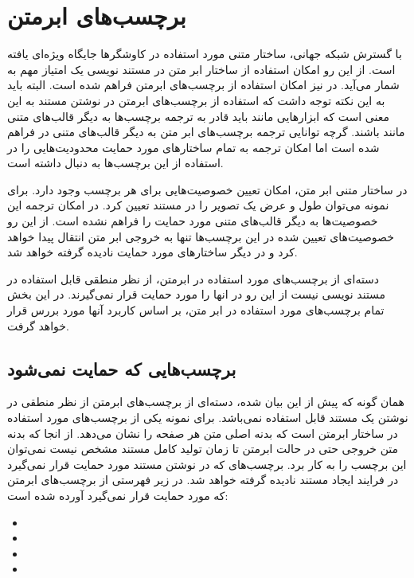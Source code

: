 
\section{برچسب‌های ابرمتن}
با گسترش شبکه جهانی، ساختار متنی مورد استفاده در کاوشگرها جایگاه ویژه‌ای یافته است. از این رو امکان
استفاده از ساختار ابر متن در مستند نویسی یک امتیاز مهم به شمار می‌آید. در  نیز امکان استفاده از برچسب‌های 
ابرمتن فراهم شده است. البته باید به این نکته توجه داشت که استفاده از برچسب‌های ابرمتن در نوشتن مستند به این معنی است که 
ابزارهایی مانند  باید قادر به ترجمه برچسب‌ها به دیگر قالب‌های متنی مانند  باشند. گرچه توانایی ترجمه
برچسب‌های ابر متن به دیگر قالب‌های متنی در  فراهم شده است اما  امکان ترجمه به تمام ساختارهای مورد حمایت محدودیت‌هایی
را در استفاده از این برچسب‌ها به دنبال داشته است.

در ساختار متنی ابر متن، امکان تعیین خصوصیت‌هایی برای هر برچسب وجود دارد. برای نمونه می‌توان  طول و عرض یک تصویر را در مستند 
تعیین کرد. در  امکان ترجمه این خصوصیت‌ها به دیگر قالب‌های متنی مورد حمایت را فراهم نشده است. از این رو خصوصیت‌های 
تعیین شده در این برچسب‌ها تنها به خروجی ابر متن انتقال پیدا خواهد کرد و در دیگر ساختارهای مورد حمایت نادیده گرفته خواهد شد.

دسته‌ای از برچسب‌های مورد استفاده در ابرمتن، از نظر منطقی قابل استفاده در مستند نویسی نیست از این رو در  انها را مورد 
حمایت قرار نمی‌گیرند. در این بخش تمام برچسب‌های مورد استفاده در ابر متن، بر اساس کاربرد‌ آنها مورد بررس قرار خواهد گرفت.

\subsection{برچسب‌هایی که حمایت نمی‌شود}
همان گونه که پیش از این بیان شده، دسته‌ای از برچسب‌های ابرمتن از نظر منطقی در نوشتن یک مستند قابل استفاده نمی‌باشد. برای نمونه
یکی از برچسب‌های مورد استفاده در ساختار ابرمتن  است که بدنه اصلی متن هر صفحه را نشان می‌دهد. از انجا که بدنه متن
خروجی حتی در حالت ابرمتن تا زمان تولید کامل مستند مشخص نیست نمی‌توان این برچسب را به کار برد. برچسب‌های که در نوشتن مستند
مورد حمایت قرار نمی‌گیرد در فرایند ایجاد مستند نادیده گرفته خواهد شد. در زیر فهرستی از برچسب‌های ابرمتن که مورد حمایت قرار نمی‌گیرد 
آورده شده است:
\begin{itemize}
 \item {}
 \item {}
 \item {}
 \item {}
\end{itemize}

